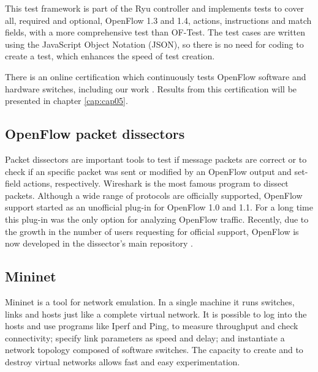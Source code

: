     This test framework is part of the Ryu controller and implements tests to cover all, required and optional, OpenFlow 1.3 and 1.4, actions, instructions and match fields, with a more comprehensive test than OF-Test. The test cases are written using the JavaScript Object Notation (JSON), so there is no need for coding to create a test, which enhances the speed of test creation. 
    
    There is an online certification which continuously tests OpenFlow software and hardware switches, including our work \cite{ryucert}. Results from this certification will be presented in chapter \ref{cap:cap05}.

    \subsection{OpenFlow packet dissectors}

    Packet dissectors are important tools to test if message packets are correct or to check if an specific packet was sent or modified by an OpenFlow output and set-field actions, respectively. Wireshark \cite{wireof} is the most famous program to dissect packets. Although a wide range of protocols are officially supported, OpenFlow support started as an  unofficial  plug-in for OpenFlow 1.0 and 1.1. For a long time this plug-in was the only option for analyzing OpenFlow traffic. Recently, due to the growth in the number of users requesting for official support, OpenFlow is now developed in the dissector's main repository \cite{wireof}.    
    \subsection{Mininet}
    
   Mininet \cite{Lantz:2010:NLR:1868447.1868466} is a tool for network emulation. In a single machine it runs switches, links and hosts just like a complete virtual network. It is possible to log into the hosts and use programs like Iperf \cite{iperf} and Ping, to measure throughput and check connectivity; specify link parameters as speed and delay; and instantiate a network topology composed of software switches. The capacity to create and to destroy virtual networks allows fast and easy experimentation. 
  
    